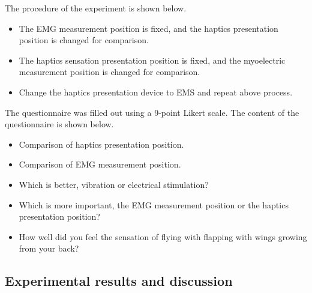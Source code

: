 \documentclass[letterpaper, 10 pt, conference]{ieeeconf}  %
\begin{document}
                The procedure of the experiment is shown below.  
                \begin{itemize}
                        \item The EMG measurement position is fixed, and the haptics presentation position is changed for comparison.
                        \item The haptics sensation presentation position is fixed, and the myoelectric measurement position is changed for comparison.
                        \item Change the haptics presentation device to EMS and repeat above process.
                \end{itemize}

                The questionnaire was filled out using a 9-point Likert scale. The content of the questionnaire is shown below. 
                \begin{itemize}
                        \item Comparison of haptics presentation position. 
                        \item Comparison of EMG measurement position.
                        \item Which is better, vibration or electrical stimulation?
                        \item Which is more important, the EMG measurement position or the haptics presentation position?
                        \item How well did you feel the sensation of flying with flapping with wings growing from your back?
                \end{itemize}
                
        \subsection{Experimental results and discussion}


\end{document}
